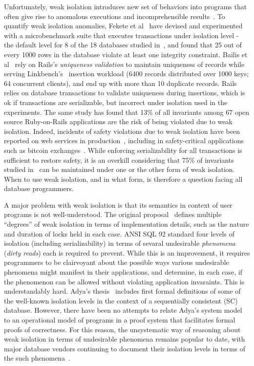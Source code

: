 Unfortunately, weak isolation introduces new set of behaviors into
programs that often give rise to anomalous executions and
incomprehensible results~\cite{berenson}. To quantify weak isolation
anomalies, Fekete et al~\cite{feketevldb09} have devised and
experimented with a microbenchmark suite that executes transactions
under  isolation level - the default level for 8
of the 18 databases studied in~\cite{bailishotos}, and found that 25
out of every 1000 rows in the database violate at least one integrity
constraint. Bailis et al~\cite{bailisferal} rely on Rails's
\emph{uniqueness validation} to maintain uniqueness of records while
serving Linkbench's~\cite{linkbench} insertion workload (6400 records
distributed over 1000 keys; 64 concurrent clients), and end up with
more than 10 duplicate records. Rails relies on database transactions
to validate uniqueness during insertions, which is ok if transactions
are serializable, but incorrect under  isolation
used in the experiments. The same study has found that 13\% of all
invariants among 67 open source Ruby-on-Rails applications are the
risk of being violated due to weak isolation. Indeed, incidents of
safety violations due to weak isolation have been reported on web
services in production~\cite{starbucksbug, scimedbug}, including in
safety-critical applications such as bitcoin
exchanges~\cite{poloniexbug, bitcoinbug}. While enforcing
serializability for all transactions is sufficient to restore safety,
it is an overkill considering that 75\% of invariants studied
in~\cite{bailisferal} can be maintained under one or the other form of
weak isolation. When to use weak isolation, and in what form, is
therefore a question facing all database programmers.

A major problem with weak isolation is that its semantics in context
of user programs is not well-understood. The original
proposal~\cite{gray1976} defines multiple ``degrees'' of weak
isolation in terms of implementation details, such as the nature and
duration of locks held in each case. ANSI SQL 92 standard four levels
of isolation (including serializability) in terms of sevaral
undesirable \emph{phenomena} (\eg \emph{dirty reads}) each is required
to prevent. While this is an improvement, it requires programmers to
be clairvoyant about the possible ways various undesirable phenomena
might manifest in their applications, and determine, in each case, if
the phenomenon can be allowed without violating application
invaraints. This is understandably hard. Adya's thesis~\cite{adyaphd}
includes first formal definitions of some of the well-known isolation
levels in the context of a sequentially consistent (SC) database.
However, there have been no attempts to relate Adya's system model to
an operational model of programs in a proof system that facilitates
formal proofs of correctness. For this reason, the unsystematic way of
reasoning about weak isolation in terms of undesirable phenomena
remains popular to date, with major database vendors continuing to
document their isolation levels in terms of the such
phenomena~\cite{postgresiso, mysqliso, oracleiso}.

